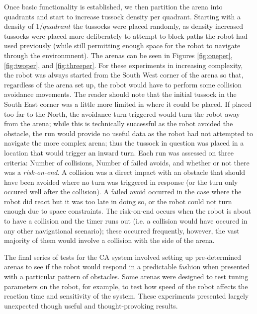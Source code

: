 \documentclass[a4paper,12pt,twoside,openright]{article}
\begin{document}
Once basic functionality is established, we then partition the arena into quadrants and start to increase tussock density per quadrant.
Starting with a density of $1/\textit{quadrant}$ the tussocks were placed randomly, as density increased tussocks were placed more
deliberately to attempt to block paths the robot had used previously (while still permitting enough space for the robot to navigate
through the environmnent). The arenas can be seen in Figures \ref{fig:oneper}, \ref{fig:twoper}, and \ref{fig:threeper}.
For these experiments in increasing complexity, the robot was always started from the South West corner
of the arena so that, regardless of the arena set up, the robot would have to perform some collision avoidance movements. The reader
should note that the initial tussock in the South East corner was a little more limited in where it could be placed. If placed too
far to the North, the avoidance turn triggered would turn the robot away from the arena; while this is technically successful as the
robot avoided the obstacle, the run would provide no useful data as the robot had not attempted to navigate the more complex arena; thus
the tussock in question was placed in a location that would trigger an inward turn. Each run was assessed on three criteria: Number of collisions,
Number of failed avoids, and whether or not there was a \textit{risk-on-end}. A collision was a direct impact with an obstacle that
should have been avoided where no turn was triggered in response (or the turn only occured well after the collision). A failed avoid occurred in
the case where the robot did react but it was too late in doing so, or the robot could not turn enough due to space constraints. The
risk-on-end occurs when the robot is about to have a collision and the timer runs out (i.e. a collision would have occured in any other
navigational scenario); these occurred frequently, however, the vast majority of them would involve a collision with the side of the arena.
\newline

The final series of tests for the CA system involved setting up pre-determined arenas to see if the robot would respond in a predictable
fashion when presented with a particular pattern of obstacles. Some arenas were designed to test tuning parameters on the robot, for example,
to test how speed of the robot affects the reaction time and sensitivity of the system. These experiments presented largely unexpected though
useful and thought-provoking results.
\newline
\end{document}

